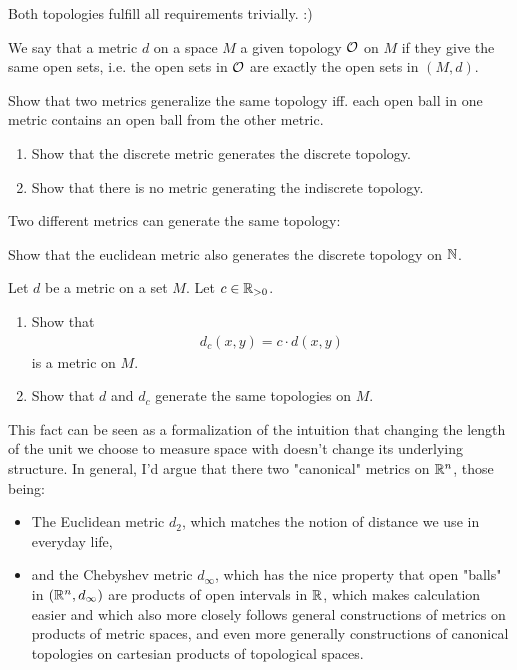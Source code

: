 \begin{proofsketch}
	Both topologies fulfill all requirements trivially. :)
\end{proofsketch}
\begin{definition}
	We say that a metric $d$ on a space $M$  a given topology $\mathcal{O}$ on $M$ if they give the same open sets, i.e. the open sets in $\mathcal{O}$ are exactly the open sets in $(M,d)$.
\end{definition}
\begin{exercise}
	Show that two metrics generalize the same topology iff. each open ball in one metric contains an open ball from the other metric.
\end{exercise}
\begin{exercise}
	\begin{enumerate}
		\item Show that the discrete metric generates the discrete topology.
		\item Show that there is no metric generating the indiscrete topology.
	\end{enumerate}
\end{exercise}
\newpar Two different metrics can generate the same topology:
\begin{exercise}
	Show that the euclidean metric also generates the discrete topology on $\mathbb{N}$.
\end{exercise}
\begin{exercise}
	Let $d$ be a metric on a set $M$. Let $c \in \mathbb{R}_{> 0}$. 
	\begin{enumerate}
		\item Show that
		\begin{align*}
			d_c(x,y) = c \cdot d(x,y)
		\end{align*}
		is a metric on $M$.
		\item Show that $d$ and $d_c$ generate the same topologies on $M$.
	\end{enumerate}
\end{exercise}
This fact can be seen as a formalization of the intuition that changing the length of the unit we choose to measure space with doesn't change its underlying structure.
\newpar
In general, I'd argue that there two "canonical" metrics on $\mathbb{R}^n$, those being:
\begin{itemize}
	\item The Euclidean metric $d_2$, which matches the notion of distance we use in everyday life,
	\item and the Chebyshev metric $d_\infty$, which has the nice property that open "balls" in $(\mathbb{R}^n, d_\infty)$ are products of open intervals in $\mathbb{R}$, which makes calculation easier and which also more closely follows general constructions of metrics on products of metric spaces, and even more generally constructions of canonical topologies on cartesian products of topological spaces.
\end{itemize}
